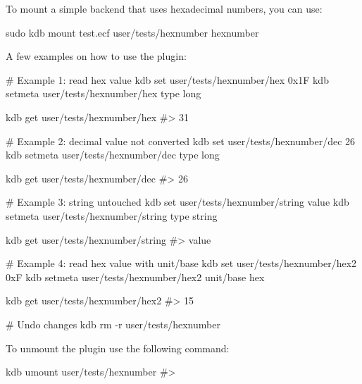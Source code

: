 \begin{DoxyItemize}
\item To mount a simple backend that uses hexadecimal numbers, you can use\+: 
\begin{DoxyCode}
sudo kdb mount test.ecf user/tests/hexnumber hexnumber
\end{DoxyCode}

\item A few examples on how to use the plugin\+:
\end{DoxyItemize}


\begin{DoxyCode}
# Example 1: read hex value
kdb set user/tests/hexnumber/hex 0x1F
kdb setmeta user/tests/hexnumber/hex type long

kdb get user/tests/hexnumber/hex
#> 31

# Example 2: decimal value not converted
kdb set user/tests/hexnumber/dec 26
kdb setmeta user/tests/hexnumber/dec type long

kdb get user/tests/hexnumber/dec
#> 26

# Example 3: string untouched
kdb set user/tests/hexnumber/string value
kdb setmeta user/tests/hexnumber/string type string

kdb get user/tests/hexnumber/string
#> value

# Example 4: read hex value with unit/base
kdb set user/tests/hexnumber/hex2 0xF
kdb setmeta user/tests/hexnumber/hex2 unit/base hex

kdb get user/tests/hexnumber/hex2
#> 15

# Undo changes
kdb rm -r user/tests/hexnumber
\end{DoxyCode}



\begin{DoxyItemize}
\item To unmount the plugin use the following command\+: 
\begin{DoxyCode}
kdb umount user/tests/hexnumber
#>
\end{DoxyCode}
 
\end{DoxyItemize}